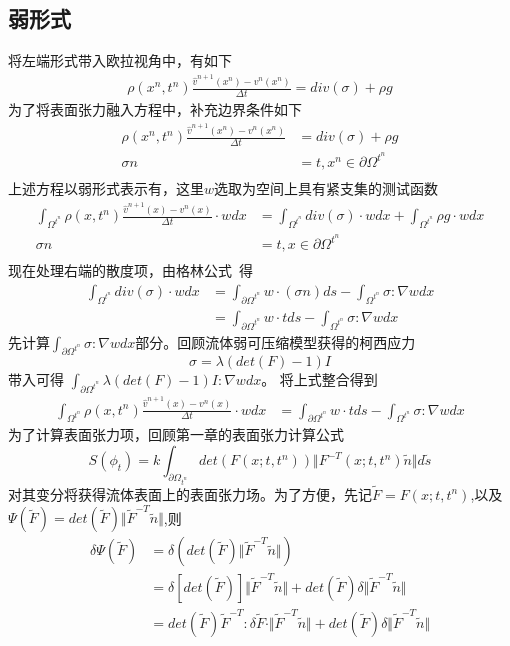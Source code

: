 \subsection{弱形式}
将左端形式带入欧拉视角中，有如下
\begin{align*}
    \rho(x^n,t^n)\frac{\hat{v}^{n+1}(x^n) - v^n(x^n)}{\Delta t} = div(\sigma) + \rho g
\end{align*}
为了将表面张力融入方程中，补充边界条件如下
\begin{align*}
    \rho(x^n,t^n)\frac{\hat{v}^{n+1}(x^n) - v^n(x^n)}{\Delta t} &= div(\sigma) + \rho g \\
    \sigma n &= t, x^n \in \partial \Omega^{t^n}\\
\end{align*}
上述方程以弱形式表示有，这里$w$选取为空间上具有紧支集的测试函数
\begin{align*}
    \int_{\Omega^{t^n}}\rho(x,t^n)\frac{\hat{v}^{n+1}(x) - v^n(x)}{\Delta t}\cdot wdx &= \int_{\Omega^{t^n}} div(\sigma)\cdot w dx + \int_{\Omega^{t^n}}\rho g\cdot w dx\\
    \sigma n &= t, x \in \partial \Omega^{t^n}\\   
\end{align*}
现在处理右端的散度项，由格林公式~\cite{evans1998partial}得
\begin{align*}
    \int_{\Omega^{t^n}} div(\sigma)\cdot w dx &= \int_{\partial \Omega^{t^n}}w\cdot (\sigma n) ds - \int_{\Omega^{t^n}} \sigma : \nabla w dx\\
        &= \int_{\partial \Omega^{t^n}}w\cdot t ds - \int_{\Omega^{t^n}} \sigma :\nabla w dx
\end{align*}
先计算$\int_{\partial \Omega^{t^n}}\sigma : \nabla w dx$部分。回顾流体弱可压缩模型获得的柯西应力$$\sigma = \lambda (det(F) - 1)I$$带入可得
$\int_{\partial \Omega^{t^n}} \lambda (det(F) - 1) I:\nabla w dx$。
将上式整合得到
\begin{align*}
    \int_{\Omega^{t^n}}\rho(x,t^n)\frac{\hat{v}^{n+1}(x) - v^n(x)}{\Delta t}\cdot wdx &= \int_{\partial \Omega^{t^n}} w\cdot t ds - \int_{\Omega^{t^n}} \sigma:\nabla w dx
\end{align*}
为了计算表面张力项，回顾第一章的表面张力计算公式
$$S(\phi_{t}) = k \int_{\partial \Omega_{t^n}} det(F(x;t,t^{n})) \Vert F^{-T}(x;t,t^{n})\tilde{n}\Vert d\tilde{s}$$
对其变分将获得流体表面上的表面张力场。为了方便，先记$\tilde{F} = F(x;t,t^n)$,以及$\Psi(\tilde{F}) = det(\tilde{F})\Vert \tilde{F}^{-T}\tilde{n} \Vert$,则
\begin{align}
    \delta \Psi(\tilde{F}) &= \delta(det(\tilde{F})\Vert \tilde{F}^{-T}\tilde{n} \Vert) \nonumber\\
    &= \delta[det(\tilde{F})] \Vert \tilde{F}^{-T} \tilde{n} \Vert + det(\tilde{F})\delta \Vert \tilde{F}^{-T}\tilde{n} \Vert \nonumber\\
    &= det(\tilde{F})\tilde{F}^{-T}:\delta \tilde{F} \cdot \Vert \tilde{F}^{-T}\tilde{n}\Vert + det(\tilde{F})\delta \Vert \tilde{F}^{-T} \tilde{n} \Vert
\end{align}
